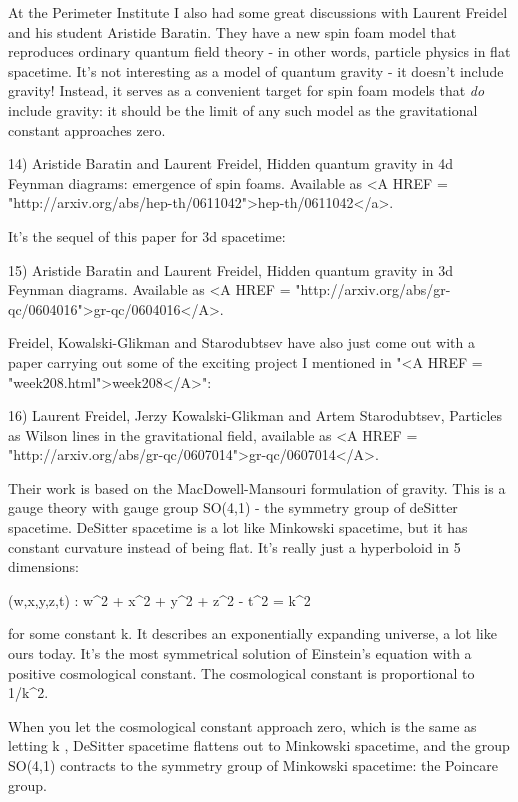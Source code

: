 At the Perimeter Institute I also had some great discussions with
Laurent Freidel and his student Aristide Baratin.  They have a new
spin foam model that reproduces ordinary quantum field theory - in
other words, particle physics in flat spacetime.  It's not interesting
as a model of quantum gravity - it doesn't include gravity!  Instead,
it serves as a convenient target for spin foam models that \emph{do}
include gravity: it should be the limit of any such model as the
gravitational constant approaches zero.

14) Aristide Baratin and Laurent Freidel, Hidden quantum gravity
in 4d Feynman diagrams: emergence of spin foams.  Available as
<A HREF = "http://arxiv.org/abs/hep-th/0611042">hep-th/0611042</a>.

It's the sequel of this paper for 3d spacetime:

15) Aristide Baratin and Laurent Freidel, Hidden quantum gravity in 3d
Feynman diagrams.  Available as <A HREF =
"http://arxiv.org/abs/gr-qc/0604016">gr-qc/0604016</A>.

Freidel, Kowalski-Glikman and Starodubtsev have also just come out with 
a paper carrying out some of the exciting project I mentioned in 
"<A HREF = "week208.html">week208</A>":

16) Laurent Freidel, Jerzy Kowalski-Glikman and Artem Starodubtsev,
Particles as Wilson lines in the gravitational field, available 
as <A HREF = "http://arxiv.org/abs/gr-qc/0607014">gr-qc/0607014</A>.  

Their work is based on the MacDowell-Mansouri formulation of gravity.
This is a gauge theory with gauge group SO(4,1) - the symmetry group 
of deSitter spacetime.  DeSitter spacetime is a lot like Minkowski 
spacetime, but it has constant curvature instead of being flat.  
It's really just a hyperboloid in 5 dimensions:

{(w,x,y,z,t) :  w^{2} + x^{2} + y^{2} + z^{2} - t^{2} = k^{2}}

for some constant k. It describes an exponentially expanding 
universe, a lot like ours today.  It's the most symmetrical 
solution of Einstein's equation with a positive cosmological 
constant.  The cosmological constant is proportional to 1/k^{2}.

When you let the cosmological constant approach zero, which is the 
same as letting k \to  \infty , DeSitter spacetime flattens out to 
Minkowski spacetime, and the group SO(4,1) contracts to the symmetry 
group of Minkowski spacetime: the Poincare group.  

